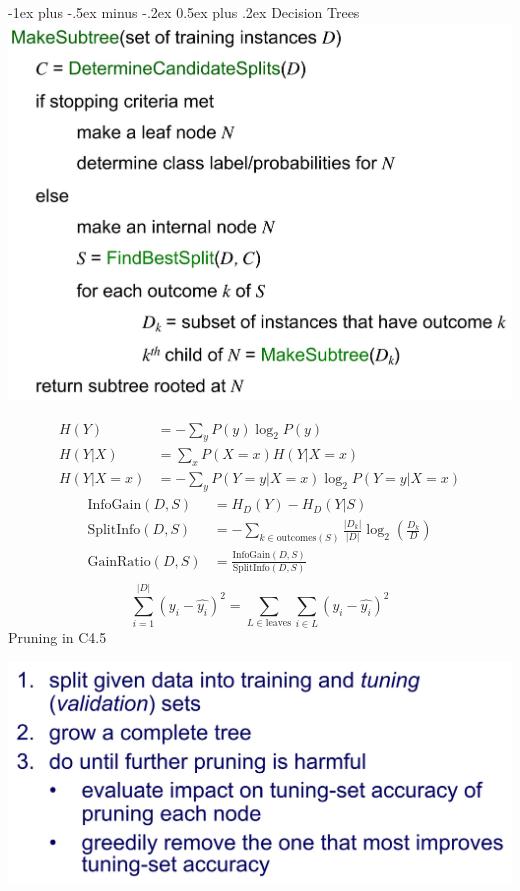 \documentclass[10pt,landscape]{article}
\makeatletter
\renewcommand{\section}{\@startsection{section}{1}{0mm}%
{-1ex plus -.5ex minus -.2ex}%
{0.5ex plus .2ex}%
{\normalfont\large\bfseries}}
\makeatother
\begin{document}
\begin{multicols}{4}
    \section{Decision Trees}
    \includegraphics[width=0.8\linewidth]{snips/04_top-down-decision-tree.jpg}
    
    \begin{align*}
        H(Y) &= - \sum_{y} P(y) \log_2 P(y) \\
        H(Y|X) &= \sum_{x} P(X=x) H(Y|X=x) \\
        H(Y|X=x) &= - \sum_{y} P(Y=y|X=x) \log_2 P(Y=y |X=x)
    \end{align*}
    \begin{align*}
        \text{InfoGain}(D,S) &= H_D(Y) - H_D(Y|S) \\
        \text{SplitInfo}(D,S) &= -\sum_{k \in \text{outcomes}(S)} \frac{|D_k|}{|D|} \log_2 \left(  \frac{D_k}{D} \right) \\
        \text{GainRatio} (D,S) &= \frac{\text{InfoGain}(D,S) }{\text{SplitInfo}(D,S) } \\
    \end{align*}
    \begin{equation*}
        \sum_{i=1}^{|D|} (y_i - \hat{y_i})^2 = \sum_{L \in \text{leaves}} \sum_{i\in L} (y_i - \hat{y_i})^2
    \end{equation*}
    Pruning in C4.5

    \includegraphics[width=0.65\linewidth]{snips/05_dt-pruning-c45.jpg}
    

\end{multicols}
\end{document}
